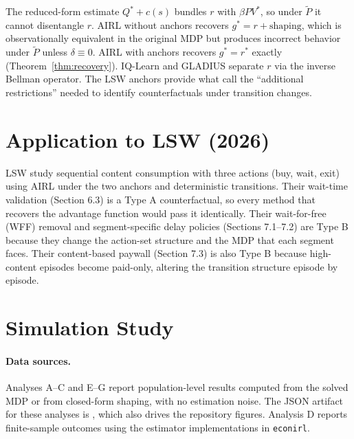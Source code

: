 \documentclass[11pt]{article}
\begin{document}
The reduced-form estimate $Q^* + c(s)$ bundles $r$ with $\beta PV^*$, so under $\tilde{P}$ it cannot disentangle $r$. AIRL without anchors recovers $g^* = r + \text{shaping}$, which is observationally equivalent in the original MDP but produces incorrect behavior under $\tilde{P}$ unless $\delta \equiv 0$. AIRL with anchors recovers $g^* = r^*$ exactly (Theorem~\ref{thm:recovery}). IQ-Learn and GLADIUS separate $r$ via the inverse Bellman operator. The LSW anchors provide what \citet{kalouptsidi2021} call the ``additional restrictions'' needed to identify counterfactuals under transition changes.

\section{Application to LSW (2026)}

LSW study sequential content consumption with three actions (buy, wait, exit) using AIRL under the two anchors and deterministic transitions. Their wait-time validation (Section 6.3) is a Type A counterfactual, so every method that recovers the advantage function would pass it identically. Their wait-for-free (WFF) removal and segment-specific delay policies (Sections 7.1--7.2) are Type B because they change the action-set structure and the MDP that each segment faces. Their content-based paywall (Section 7.3) is also Type B because high-content episodes become paid-only, altering the transition structure episode by episode.

\section{Simulation Study}

\paragraph{Data sources.} Analyses A--C and E--G report population-level results computed from the solved MDP or from closed-form shaping, with no estimation noise. The JSON artifact for these analyses is , which also drives the repository figures. Analysis D reports finite-sample outcomes using the estimator implementations in \texttt{econirl}.
\end{document}

